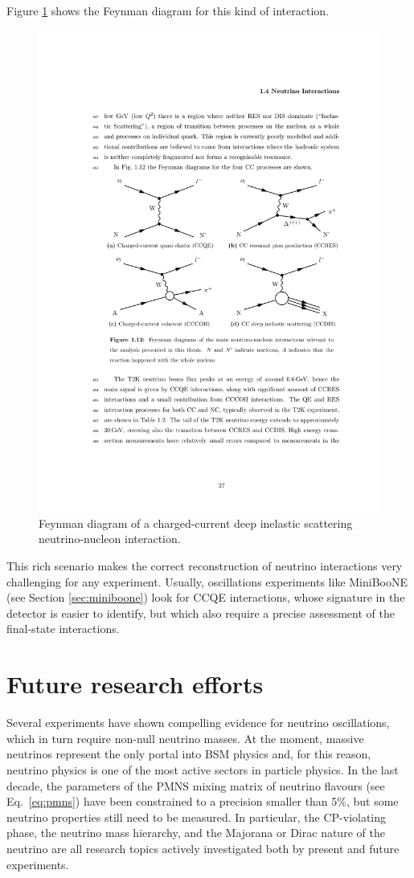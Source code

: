 \begin{description}
Figure \ref{fig:ccdis_feyn} shows the Feynman diagram for this kind of interaction.

\begin{figure}[htbp]
    \centering
    \includegraphics[width=0.65\linewidth]{figures/ccdis_feyn.pdf}
    \caption{Feynman diagram of a charged-current deep inelastic scattering neutrino-nucleon interaction.}
    \label{fig:ccdis_feyn}
\end{figure}


\end{description}

This rich scenario makes the correct reconstruction of neutrino interactions very challenging for any experiment. Usually, oscillations experiments like MiniBooNE (see Section \ref{sec:miniboone}) look for CCQE interactions, whose signature in the detector is easier to identify, but which also require a precise assessment of the final-state interactions.

\section{Future research efforts}
Several experiments have shown compelling evidence for neutrino oscillations, which in turn require non-null neutrino masses. At the moment, massive neutrinos represent the only portal into BSM physics and, for this reason, neutrino physics is one of the most active sectors in particle physics. In the last decade, the parameters of the PMNS mixing matrix of neutrino flavours (see Eq.~\ref{eq:pmns}) have been constrained to a precision smaller than 5\%, but some neutrino properties still need to be measured. In particular, the CP-violating phase, the neutrino mass hierarchy, and the Majorana or Dirac nature of the neutrino are all research topics actively investigated both by present and future experiments. 

